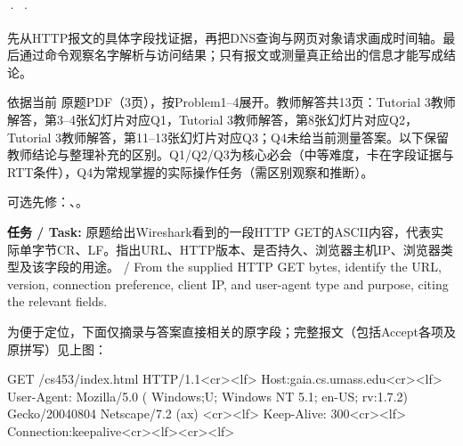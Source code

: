 


 ·  · 


先从HTTP报文的具体字段找证据，再把DNS查询与网页对象请求画成时间轴。最后通过命令观察名字解析与访问结果；只有报文或测量真正给出的信息才能写成结论。

依据当前 原题PDF（3页），按Problem1–4展开。教师解答共13页：Tutorial 3教师解答，第3–4张幻灯片对应Q1，Tutorial 3教师解答，第8张幻灯片对应Q2，Tutorial 3教师解答，第11–13张幻灯片对应Q3；Q4未给当前测量答案。以下保留教师结论与整理补充的区别。Q1/Q2/Q3为核心必会（中等难度，卡在字段证据与RTT条件），Q4为常规掌握的实际操作任务（需区别观察和推断）。


可选先修：、。








\textbf{任务 / Task:} 原题给出Wireshark看到的一段HTTP GET的ASCII内容，代表实际单字节CR、LF。指出URL、HTTP版本、是否持久、浏览器主机IP、浏览器类型及该字段的用途。 / From the supplied HTTP GET bytes, identify the URL, version, connection preference, client IP, and user-agent type and purpose, citing the relevant fields.




为便于定位，下面仅摘录与答案直接相关的原字段；完整报文（包括Accept各项及原拼写）见上图：



\begin{StudyCode}
GET /cs453/index.html HTTP/1.1<cr><lf>
Host:gaia.cs.umass.edu<cr><lf>
User-Agent: Mozilla/5.0 ( Windows;U; Windows NT 5.1; en-US; rv:1.7.2)
Gecko/20040804 Netscape/7.2 (ax) <cr><lf>
Keep-Alive: 300<cr><lf>
Connection:keepalive<cr><lf><cr><lf>
\end{StudyCode}


